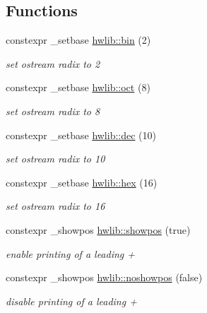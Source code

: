 \subsection*{Functions}
\begin{DoxyCompactItemize}
\item 
constexpr \+\_\+setbase \hyperlink{hwlib-ostream_01-_01_copy_8hpp_a2f624a643c9c8d30b5e4f3dca914e28e}{hwlib\+::bin} (2)
\begin{DoxyCompactList}\small\item\em set ostream radix to 2 \end{DoxyCompactList}\item 
constexpr \+\_\+setbase \hyperlink{hwlib-ostream_01-_01_copy_8hpp_a9711974fb746e16a55e130b461cad619}{hwlib\+::oct} (8)
\begin{DoxyCompactList}\small\item\em set ostream radix to 8 \end{DoxyCompactList}\item 
constexpr \+\_\+setbase \hyperlink{hwlib-ostream_01-_01_copy_8hpp_ab8f3a2357c88d53861c09dbd17f14f1b}{hwlib\+::dec} (10)
\begin{DoxyCompactList}\small\item\em set ostream radix to 10 \end{DoxyCompactList}\item 
constexpr \+\_\+setbase \hyperlink{hwlib-ostream_01-_01_copy_8hpp_a4726c8f4bef5591b6f6853041328a04f}{hwlib\+::hex} (16)
\begin{DoxyCompactList}\small\item\em set ostream radix to 16 \end{DoxyCompactList}\item 
constexpr \+\_\+showpos \hyperlink{hwlib-ostream_01-_01_copy_8hpp_a7bb9927f52011b4cc4a90b03e98f95fd}{hwlib\+::showpos} (true)
\begin{DoxyCompactList}\small\item\em enable printing of a leading \textquotesingle{}+\textquotesingle{} \end{DoxyCompactList}\item 
constexpr \+\_\+showpos \hyperlink{hwlib-ostream_01-_01_copy_8hpp_accdd72e1358d667a9458767d886b2a53}{hwlib\+::noshowpos} (false)
\begin{DoxyCompactList}\small\item\em disable printing of a leading \textquotesingle{}+\textquotesingle{} \end{DoxyCompactList}\item 

\end{DoxyCompactItemize}
